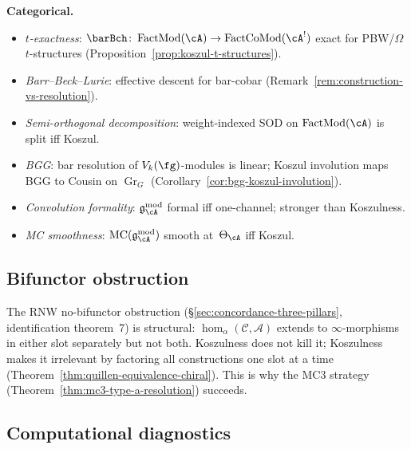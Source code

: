 \smallskip\noindent\textbf{Categorical.}
\begin{itemize}[nosep]
\item \emph{$t$-exactness}: $\barBch \colon \operatorname{FactMod}(\cA) \to \operatorname{FactCoMod}(\cA^!)$ exact for PBW/$\Omega$ $t$-structures (Proposition~\ref{prop:koszul-t-structures}).
\item \emph{Barr--Beck--Lurie}: effective descent for bar-cobar (Remark~\ref{rem:construction-vs-resolution}).
\item \emph{Semi-orthogonal decomposition}: weight-indexed SOD on $\operatorname{FactMod}(\cA)$ is split iff Koszul.
\item \emph{BGG}: bar resolution of $V_k(\fg)$-modules is linear; Koszul involution maps BGG to Cousin on $\operatorname{Gr}_G$ (Corollary~\ref{cor:bgg-koszul-involution}).
\item \emph{Convolution formality}: $\mathfrak{g}_\cA^{\mathrm{mod}}$ formal iff one-channel; stronger than Koszulness.
\item \emph{MC smoothness}: $\operatorname{MC}(\mathfrak{g}_\cA^{\mathrm{mod}})$ smooth at~$\Theta_\cA$ iff Koszul.
\end{itemize}


\subsection{Bifunctor obstruction}
\label{subsec:concordance-bifunctor-obstruction}

The RNW no-bifunctor obstruction \cite{RNW19}
(\S\ref{sec:concordance-three-pillars}, identification
theorem~7) is structural: $\operatorname{hom}_\alpha(
\mathcal{C},\mathcal{A})$ extends to $\infty$-morphisms in
either slot separately but not both.  Koszulness does not kill
it; Koszulness makes it irrelevant by factoring all
constructions one slot at a time
(Theorem~\ref{thm:quillen-equivalence-chiral}).  This is why
the MC3 strategy
(Theorem~\ref{thm:mc3-type-a-resolution}) succeeds.
\label{rem:concordance-bifunctor-koszul}


\subsection{Computational diagnostics}
\label{subsec:concordance-computational-diagnostics}

